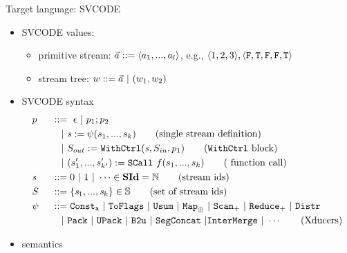 \documentclass{beamer}
\begin{document}
\begin{frame}{Target language: SVCODE}
	\begin{itemize}
	\item SVCODE values:
		\begin{itemize}
			\item primitive stream: $\a ::= \<a_1,...,a_l\'>$, e.g., $\<1,2,3\'>, \<\F, \T, \F ,\F, \T \'>$
			\item stream tree: $w ::= \a \ | \ (w_1,w_2)$
		\end{itemize}
		
	\item SVCODE syntax
		{\small \begin{alignat*}{2} 
		&p  && :: = \ \epsilon \ | \ p_1;p_2 \\ 
		&   && \quad | \ \sdef{\s}{\psi(s_1,...,s_k)}  \tag{single stream definition}\\
		&   && \quad | \ \withctrl{\s}{p_1}{\Sin}{\Sout}  \tag{\wc block}\\
		&   && \quad | \ \scall{f}{s_1,...,s_k}{(s_1',...,s_{k'}')} \tag{ function call}\\
		&\s && ::= 0 \ | \ 1 \ | \ \cdots \in \SId  = \mathbb{N}   \tag{stream ids}\\
		&  \S && ::= \{\s_1,..., \s_k\} \in \sset  \tag{set of stream ids}\\
		& \psi \ && ::= \consta{a} \ | \ \toflag  
		\ | \ \usum \ | \ \map{\oplus} \ | \ \genscan_{+} \ | \ \genreduce_{+} \ | \ \distr    \\
		&   && \quad  | \ \pack \ | \ \upack \ | \ \bu \ | \ \segconcat \ | \intermerge \ | \ \cdots  \tag{Xducers} \\	
		\end{alignat*}}
		
		\item semantics
	\end{itemize}
\end{frame}
\end{document}
